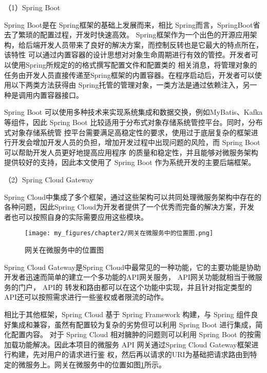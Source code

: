 （1）Spring Boot


Spring Boot是在 Spring框架的基础上发展而来\cite{konggyong2015keji}，相比 Spring而言，SpringBoot省去了繁琐的配置过程，开发时快速高效。
Spring框架作为一个出色的开源应用架构，给后端开发人员带来了良好的解决方案，而控制反转也是它最大的特点所在，该特性
可以通过内置容器的设计思想对对象生命周期进行有效的管控。开发者可以使用Spring所规定的的格式撰写配置文件和配置类的
相关消息，将管理对象的任务由开发人员直接传递至Spring框架的内置容器\cite{kongqingyong201ji}。在程序启动后，开发者可以使用以下两类方法获得由
Spring托管的管理对象，一类方法是通过依赖注入，另一种是调用内置容器接口。

Spring Boot 可以使用多种技术来实现系统集成和数据交换，例如MyBatis、Kafka 等组件，因此 Spring Boot 比较适用于分布式对象存储系统管控平台。同时，分布式对象存储系统管
控平台需要满足高稳定性的要求，使用过于底层复杂的框架进行开发会增加开发人员的负担，增加开发过程中出现问题的风险，而 Spring Boot 可以帮助开发人员更好地提高应用程序
的质量和稳定性，并且能够对微服务架构提供较好的支持，因此本文使用了 Spring Boot 作为系统开发的主要后端框架。


（2）Spring Cloud Gateway

Spring Cloud中集成了多个框架，通过这些架构可以共同处理微服务架构中存在的各种问题\cite{kon2201ji}，因此Spring Cloud为开发者提供了一个优秀而完备的解决方案，开发
者也可以按照自身的实际需要应用这些模块。

\begin{figure}[h]
    \centering
    \texttt{[image: my\_figures/chapter2/网关在微服务中的位置图.png]}
    \caption{网关在微服务中的位置图}
    \label{fig:/网关在微服务中的位置图}
\end{figure}

Spring Cloud Gateway是Spring Cloud中最常见的一种功能，它的主要功能是协助开发者迅速而简单的建立一个多功能的API网关服务， API网关功能就相当于微服务的门户， API的
转发和路由都可以在这个功能中实现，并且针对指定类型的API还可以按照需求进行一些鉴权或者限流的动作。

相比于其他框架，Spring Cloud 基于 Spring Framework 构建，与 Spring 组件良好集成和兼容，虽然有配置较为复杂的劣势但可以利用 Spring Boot 进行集成，简化配置内容。
对于 Spring Cloud 相对臃肿的问题则可以利用 Spring Boot 的按需加载功能解决。因此本项目的微服务 API 网关通过Spring Cloud Gateway框架进行构建，先对用户的请求进行鉴
权，然后再以请求的URI为基础把请求路由到特定的微服务上。网关在微服务中的位置如图\ref{fig:/网关在微服务中的位置图}所示。


